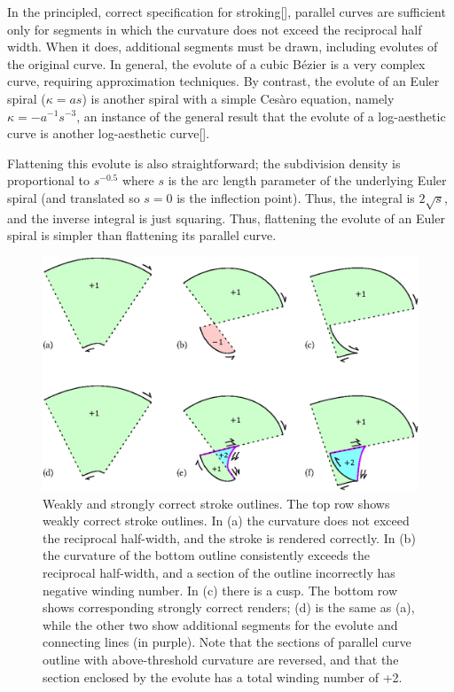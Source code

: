 \documentclass[sigconf]{acmart}
\begin{document}
In the principled, correct specification for stroking[], parallel curves are sufficient only for segments in which the curvature does not exceed the reciprocal half width. When it does, additional segments must be drawn, including evolutes of the original curve. In general, the evolute of a cubic Bézier is a very complex curve, requiring approximation techniques. By contrast, the evolute of an Euler spiral ($\kappa = as$) is another spiral with a simple Cesàro equation, namely $\kappa = -a^{-1}s^{-3}$, an instance of the general result that the evolute of a log-aesthetic curve is another log-aesthetic curve[].

Flattening this evolute is also straightforward; the subdivision density is proportional to $s^{-0.5}$ where $s$ is the arc length parameter of the underlying Euler spiral (and translated so $s = 0$ is the inflection point). Thus, the integral is $2\sqrt{s}$, and the inverse integral is just squaring. Thus, flattening the evolute of an Euler spiral is simpler than flattening its parallel curve.

\begin{figure}
    \includegraphics[scale=0.6]{evolute_fig}
    \caption{Weakly and strongly correct stroke outlines. The top row shows weakly correct stroke outlines. In (a) the curvature does not exceed the reciprocal half-width, and the stroke is rendered correctly. In (b) the curvature of the bottom outline consistently exceeds the reciprocal half-width, and a section of the outline incorrectly has negative winding number. In (c) there is a cusp. The bottom row shows corresponding strongly correct renders; (d) is the same as (a), while the other two show additional segments for the evolute and connecting lines (in purple). Note that the sections of parallel curve outline with above-threshold curvature are reversed, and that the section enclosed by the evolute has a total winding number of +2.}
    \label{fig:evolutes}
\end{figure}
\end{document}
